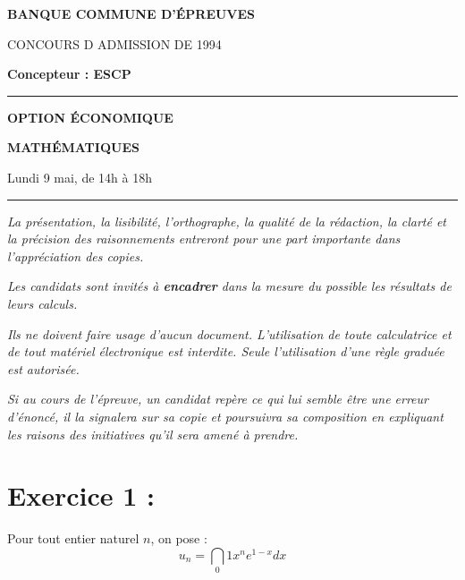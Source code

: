 \documentclass[11pt]{article}%
\begin{document}

\begin{center}
{\LARG\E\textbf{BANQUE COMMUNE D'ÉPREUVES}}



{\large \textsc{CONCOURS D ADMISSION DE 1994}}



{\large \textbf{Concepteur : ESCP}}



\rule{2.39cm}{0.05cm}



{\Large \textbf{OPTION ÉCONOMIQUE}}



{\Large \textbf{MATHÉMATIQUES }}



{\Large Lundi 9 mai, de 14h à 18h}



\rule{2.39cm}{0.05cm}
\end{center}

\textit{La présentation, la lisibilité, l'orthographe, la qualité
de la rédaction, la clarté et la précision des raisonnements
entreront pour une part importante dans l'appréciation des copies.}

\textit{Les candidats sont invités à \textbf{encadrer} dans la mesure
du possible les résultats de leurs calculs.}

\textit{Ils ne doivent faire usage d'aucun document. L'utilisation de
toute
calculatrice et de tout matériel électronique est interdite. Seule
l'utilisation d'une règle graduée est autorisée.}

\textit{Si au cours de l'épreuve, un candidat repère ce qui lui semble
être une erreur d'énoncé, il la signalera sur sa copie et
poursuivra sa composition en expliquant les raisons des initiatives
qu'il sera
amené à prendre.}

\vspace*{3cm}

\section*{\protect\Large Exercice 1 :}

Pour tout entier naturel $n$, on pose : 
\[
u_{n} = \dint\limits_{0}{1}x^{n}e^{1-x}dx
\]
\end{document}
